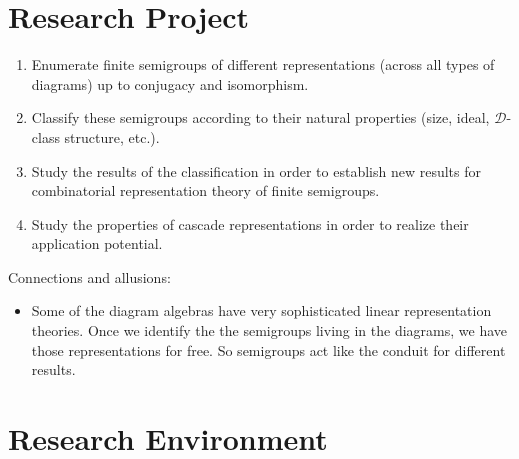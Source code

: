 \documentclass{amsart}
\newcommand{\BinRel}{\text{B}}
\newcommand{\Partition}{\mathcal P}
\newcommand{\cD}{\mathcal D}
\begin{document}


\section{Research Project}

\begin{enumerate}
\item Enumerate finite semigroups of different representations (across all types of diagrams) up to conjugacy and isomorphism.
\item Classify these semigroups according to their natural properties (size, ideal, $\cD$-class structure, etc.).
\item Study the results of the classification in order to establish new results for combinatorial representation theory of finite semigroups.
\item Study the properties of cascade representations in order to realize their application potential.
\end{enumerate}


Connections and allusions:
\begin{itemize}
\item Some of the diagram algebras have very sophisticated linear representation theories. Once we identify the the semigroups living in the diagrams, we have those representations for free. So semigroups act like the conduit for different results.
\end{itemize}


\section{Research Environment}






\end{document}
